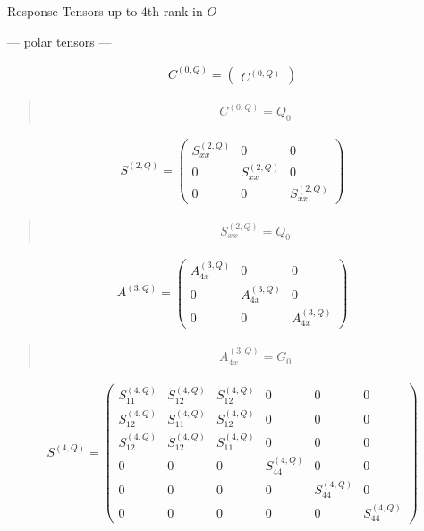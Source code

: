 \documentclass[fleqn,10pt]{jsarticle}
\begin{document}
\setcounter{MaxMatrixCols}{16}

\begin{center}
\LARGE
Response Tensors up to 4th rank in $O$
\end{center}
\begin{center}\LARGE --- polar tensors ---\end{center}
\begin{align*}
C^{(0,Q)} = \begin{pmatrix} C^{(0,Q)} \end{pmatrix}
\end{align*}
\begin{quote}
\begin{align*}
& C^{(0,Q)} = Q_{0}
\end{align*}
\end{quote}
\begin{align*}
S^{(2,Q)} = \begin{pmatrix} S^{(2,Q)}_{xx} & 0 & 0 \\ 0 & S^{(2,Q)}_{xx} & 0 \\ 0 & 0 & S^{(2,Q)}_{xx} \end{pmatrix}
\end{align*}
\begin{quote}
\begin{align*}
& S^{(2,Q)}_{xx} = Q_{0}
\end{align*}
\end{quote}
\begin{align*}
A^{(3,Q)} = \begin{pmatrix} A^{(3,Q)}_{4x} & 0 & 0 \\ 0 & A^{(3,Q)}_{4x} & 0 \\ 0 & 0 & A^{(3,Q)}_{4x} \end{pmatrix}
\end{align*}
\begin{quote}
\begin{align*}
& A^{(3,Q)}_{4x} = G_{0}
\end{align*}
\end{quote}
\begin{align*}
S^{(4,Q)} = \begin{pmatrix} S^{(4,Q)}_{11} & S^{(4,Q)}_{12} & S^{(4,Q)}_{12} & 0 & 0 & 0 \\ S^{(4,Q)}_{12} & S^{(4,Q)}_{11} & S^{(4,Q)}_{12} & 0 & 0 & 0 \\ S^{(4,Q)}_{12} & S^{(4,Q)}_{12} & S^{(4,Q)}_{11} & 0 & 0 & 0 \\ 0 & 0 & 0 & S^{(4,Q)}_{44} & 0 & 0 \\ 0 & 0 & 0 & 0 & S^{(4,Q)}_{44} & 0 \\ 0 & 0 & 0 & 0 & 0 & S^{(4,Q)}_{44} \end{pmatrix}
\end{align*}
\end{document}
